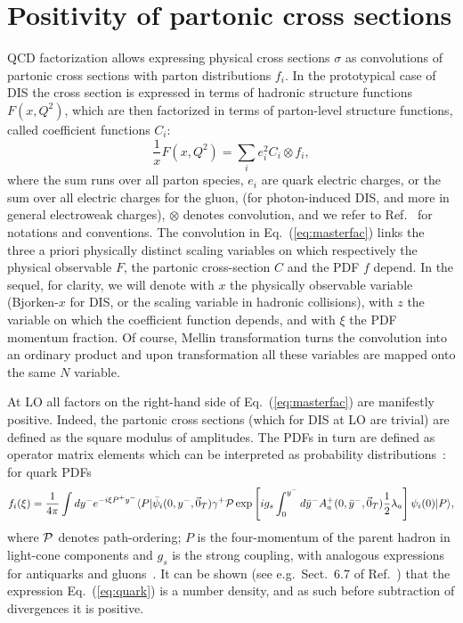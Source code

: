 
\section{Positivity of partonic cross sections}
\label{sec:pos/subtr}



QCD factorization allows expressing physical cross sections $\sigma$  as
convolutions of partonic cross sections with parton distributions $f_i$. 
In the prototypical case of DIS the cross section is expressed in terms of
hadronic structure functions $F(x,Q^2)$, which are then factorized in terms of
parton-level structure functions, called coefficient functions $C_i$:
\begin{equation}
  \label{eq:masterfac}
 \frac{1}{x} F(x,Q^2)=\sum_{i} e^2_i C_i \otimes f_i ,
\end{equation}
where the sum runs over all parton species, $e_i$ are quark electric charges,
or the sum over all electric charges for the gluon, (for photon-induced DIS,
and more in general electroweak charges), $\otimes$ denotes convolution, and we
refer to Ref.~\cite{Ellis:1991qj} for notations and conventions. 
The convolution in Eq.~(\ref{eq:masterfac}) links the three a priori physically
distinct scaling variables on which respectively the physical observable $F$,
the partonic cross-section $C$ and the PDF $f$ depend.
In the sequel, for
clarity, we will denote with $x$ the physically observable variable
(Bjorken-$x$ for DIS, or the scaling variable in hadronic collisions), with $z$
the variable on which the coefficient function depends, and with $\xi$ the PDF
momentum fraction.
Of course, Mellin transformation turns the convolution into an ordinary product
and upon transformation all these variables are mapped onto the same $N$
variable. 
 

  At LO all factors on the
  right-hand side of
  Eq.~(\ref{eq:masterfac}) are manifestly positive. Indeed, the partonic
  cross sections (which for DIS at LO are trivial) are defined as the square modulus of amplitudes. The
  PDFs in turn are defined as operator matrix elements
  which can be interpreted as probability
  distributions~\cite{Collins:1981uw,Curci:1980uw}: for quark
  PDFs~\cite{Collins:1981uw}  
  \begin{equation}
    \label{eq:quark}
f_i(\xi)=\frac{1}{4\pi}\int dy^- e^{-i \xi P^+ y^-}\langle P| 
\bar \psi_i(0,y^-,\vec 0_T)\gamma^+ {\cal P} \exp\left[ i g_s \int_0^{y^-} d
  \bar y^- A_a^+(0,\bar y^-,\vec 0_T)\frac{1}{2} \lambda_a\right] \psi_i(0) |P\rangle ,
\end{equation}
where ${\cal P}$ denotes path-ordering; $P$ is the four-momentum of
the parent hadron in light-cone components and $g_s$ is the strong
coupling, with analogous expressions for antiquarks and
gluons~\cite{Collins:1981uw}.  It can be shown (see
e.g.\ Sect.~6.7 of Ref.~\cite{Collins:2011zzd}) that the expression
Eq.~(\ref{eq:quark}) is a number density, and as such before
subtraction of divergences it is positive.

